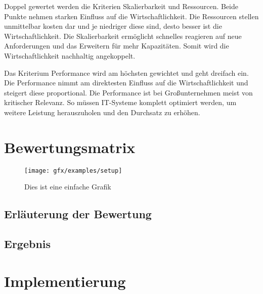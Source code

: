 Doppel gewertet werden die Kriterien Skalierbarkeit und Ressourcen. Beide Punkte nehmen starken Einfluss auf die Wirtschaftlichkeit. Die Ressourcen stellen unmittelbar kosten dar und je niedriger diese sind, desto besser ist die Wirtschaftlichkeit. Die Skalierbarkeit ermöglicht schnelles reagieren auf neue Anforderungen und das Erweitern für mehr Kapazitäten. Somit wird die Wirtschaftlichkeit nachhaltig angekoppelt.

Das Kriterium Performance wird am höchsten gewichtet und geht dreifach ein. Die Performance nimmt am direktesten Einfluss auf die Wirtschaftlichkeit und steigert diese proportional. Die Performance ist bei Großunternehmen meist von kritischer Relevanz. So müssen IT-Systeme komplett optimiert werden, um weitere Leistung herauszuholen und den Durchsatz zu erhöhen. 

\section{Bewertungsmatrix}
\begin{figure}[htbp]
    \centering
    \texttt{[image: gfx/examples/setup]}
    \caption{Dies ist eine einfache Grafik}
    \label{fig:chapter03:setup}
   \end{figure}


\subsection{Erläuterung der Bewertung}

\subsection{Ergebnis}

\section{Implementierung}